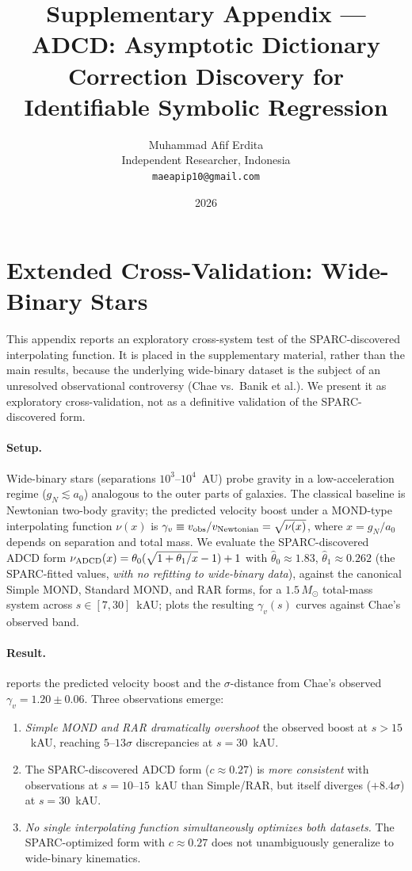 \documentclass[11pt,a4paper]{article}
\title{\textbf{Supplementary Appendix --- ADCD: Asymptotic Dictionary Correction Discovery for Identifiable Symbolic Regression}}
\author{Muhammad Afif Erdita \\ Independent Researcher, Indonesia \\ \texttt{maeapip10@gmail.com}}
\date{2026}
\begin{document}
\maketitle

\appendix

\section{Extended Cross-Validation: Wide-Binary Stars}
\label{app:wide-binary}

This appendix reports an exploratory cross-system test of the SPARC-discovered
interpolating function. It is placed in the supplementary material,
rather than the main results, because the underlying wide-binary dataset is the
subject of an unresolved observational controversy (Chae vs.\ Banik et al.). We present it as exploratory
cross-validation, not as a definitive validation of the SPARC-discovered form.

\paragraph{Setup.}
Wide-binary stars (separations $10^3$--$10^4$~AU) probe gravity in a
low-acceleration regime ($g_N \lesssim a_0$) analogous to the outer parts of
galaxies. The classical baseline is Newtonian two-body gravity; the predicted
velocity boost under a MOND-type interpolating function $\nu(x)$ is
$\gamma_v \equiv v_{\rm obs}/v_{\rm Newtonian} = \sqrt{\nu(x)}$, where
$x = g_N/a_0$ depends on separation and total mass. We evaluate the
SPARC-discovered ADCD form $\nu_{\rm ADCD}(x) = \theta_0(\sqrt{1+\theta_1/x}-1)+1$
with $\hat\theta_0 \approx 1.83$, $\hat\theta_1 \approx 0.262$ (the
SPARC-fitted values, \emph{with no refitting to wide-binary data}), against
the canonical Simple MOND, Standard MOND, and RAR forms, for a $1.5\,M_\odot$
total-mass system across $s \in [7,30]$~kAU;
 plots the resulting $\gamma_v(s)$ curves against
Chae's observed band.

\paragraph{Result.}
 reports the predicted velocity boost and the
$\sigma$-distance from Chae's observed $\gamma_v = 1.20 \pm 0.06$.
Three observations emerge:
\begin{enumerate}
    \item \emph{Simple MOND and RAR dramatically overshoot} the observed boost
    at $s>15$~kAU, reaching $5$--$13\sigma$ discrepancies at $s=30$~kAU.
    \item The SPARC-discovered ADCD form ($c\approx 0.27$) is \emph{more
    consistent} with observations at $s=10$--$15$~kAU than Simple/RAR, but
    itself diverges ($+8.4\sigma$) at $s=30$~kAU.
    \item \emph{No single interpolating function simultaneously optimizes both
    datasets.} The SPARC-optimized form with $c\approx 0.27$ does not
    unambiguously generalize to wide-binary kinematics.
\end{enumerate}
\end{document}
